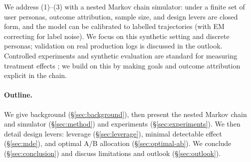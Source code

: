 We address (1)--(3) with a nested Markov chain simulator: under a finite set of user personas, outcome attribution, sample size, and design levers are closed form, and the model can be calibrated to labelled trajectories (with EM correcting for label noise). We focus on this synthetic setting and discrete personas; validation on real production logs is discussed in the outlook. Controlled experiments and synthetic evaluation are standard for measuring treatment effects \citep{kohavi2020trustworthy, rubin2005causal}; we build on this by making goals and outcome attribution explicit in the chain.

\paragraph{Outline.}
We give background (\S\ref{sec:background}), then present the nested Markov chain and simulator (\S\ref{sec:method}) and experiments (\S\ref{sec:experiments}). We then detail design levers: leverage (\S\ref{sec:leverage}), minimal detectable effect (\S\ref{sec:mde}), and optimal A/B allocation (\S\ref{sec:optimal-ab}). We conclude (\S\ref{sec:conclusion}) and discuss limitations and outlook (\S\ref{sec:outlook}).

